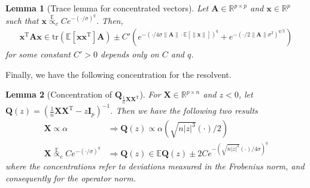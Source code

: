 \documentclass[12pt]{article}
\newtheorem{lemma}{Lemma}
\begin{document}
\begin{lemma}[Trace lemma for concentrated vectors]
Let $\mathbf{A} \in \mathbb{R}^{p \times p}$ and $\mathbf{x} \in \mathbb{R}^p$ such that $\mathbf{x} \mathrel{\overset{\mathbb{E}}{\propto}}_{c} Ce^{-(\cdot/\sigma)^q}$. Then,
\begin{align*}
\mathbf{x}^{\mathrm{T}}\mathbf{A}\mathbf{x} \in \mathrm{tr}(\mathbb{E}[\mathbf{x}\mathbf{x}^{\mathrm{T}}]\mathbf{A}) \pm C' \left( e^{-(\cdot/4\sigma\|\mathbf{A}\|\cdot\mathbb{E}[\|\mathbf{x}\|])^q} + e^{-(\cdot/2\|\mathbf{A}\|\sigma^2)^{q/2}} \right)
\end{align*}
for some constant $C' > 0$ depends only on $C$ and $q$.
\end{lemma}

Finally, we have the following concentration for the resolvent.
\begin{lemma}[Concentration of $\mathbf{Q}_{\frac{1}{n} \mathbf{X}\mathbf{X}^{\mathrm{T}}}$]\label{lem:concentration-resolvent}
For $\mathbf{X} \in \mathbb{R}^{p \times n}$ and $z < 0$, let $\mathbf{Q}(z) = \left(\frac{1}{n}\mathbf{X}\mathbf{X}^{\mathrm{T}} - z\mathbf{I}_p\right)^{-1}$. Then we have the following two results
\begin{align*}
\mathbf{X} \propto \alpha &\Rightarrow \mathbf{Q}(z) \propto \alpha \left(\sqrt{n|z|^3}(\cdot)/2\right) \\
\mathbf{X} \mathrel{\overset{\mathbb{E}}{\propto}}_{c} Ce^{-(\cdot/\sigma)^q} &\Rightarrow \mathbf{Q}(z) \in \mathbb{E}\mathbf{Q}(z) \pm 2Ce^{-\left(\sqrt{n|z|^3}(\cdot)/4\sigma\right)^q}
\end{align*}
where the concentrations refer to deviations measured in the Frobenius norm, and consequently for the operator norm.
\end{lemma}
\end{document}
